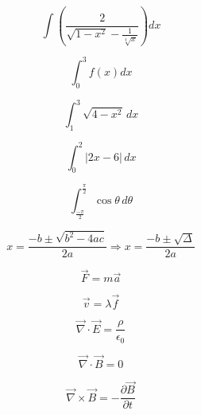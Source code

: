 \documentclass[a4paper, 12pt]{article}
\begin{document}
\begin{equation}
\int\left(\frac{2}{\sqrt{1 - x^2} - \frac{1}{\sqrt[4]{x}}}\right)dx
\end{equation}

\begin{equation}
\int_{0}^{3}f(x)dx
\end{equation}

\begin{equation}
\int_{1}^{3}\sqrt{4 - x^{2}}\, dx
\end{equation}

\begin{equation}
\int_{0}^{2} \vert 2x - 6 \vert\, dx
\end{equation}

\begin{equation}
\int_{\frac{-\pi}{2}}^{\frac{\pi}{2}} \cos \theta\, d\theta
\end{equation}

\begin{equation}
x = \frac{-b \pm \sqrt{b^{2} - 4ac}}{2a} \Rightarrow x = \frac{-b \pm \sqrt{\Delta}}{2a}
\end{equation}

\begin{equation}
\vec{F} = m\vec{a}
\end{equation}

\begin{equation}
\vec{v} = \lambda\vec{f}
\end{equation}

\begin{equation}
\vec{\nabla} \cdot \vec{E} = \frac{\rho}{\epsilon_{0}}
\end{equation}

\begin{equation}
\vec{\nabla} \cdot \vec{B} = 0
\end{equation}

\begin{equation}
\vec{\nabla} \times \vec{B} = -\frac{\partial\vec{B}}{\partial t}
\end{equation}
\end{document}
